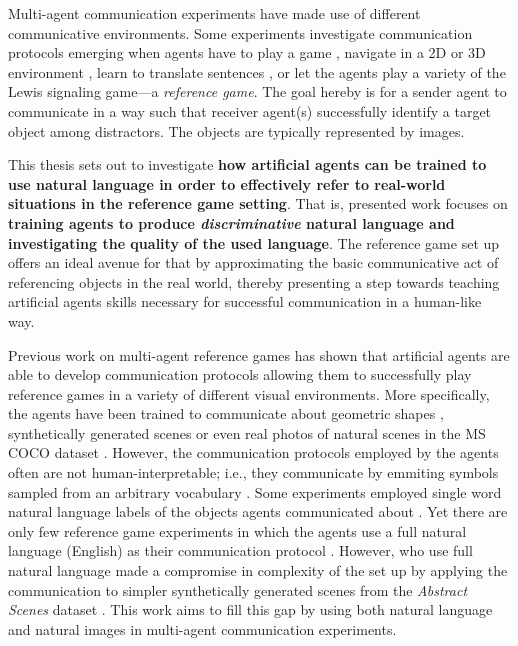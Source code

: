 Multi-agent communication experiments have made use of different communicative environments. Some experiments investigate communication protocols emerging when agents have to play a game \parencite{jacob2021multitasking}, navigate in a 2D or 3D environment \parencite{das2019tarmac, jaques2019social}, learn to translate sentences \parencite{lee2019countering}, or let the agents play a variety of the Lewis signaling game---a \textit{reference game}. The goal hereby is for a sender agent to communicate in a way such that receiver agent(s) successfully identify a target object among distractors. The objects are typically represented by images. 

This thesis sets out to investigate \textbf{how artificial agents can be trained to use natural language in order to effectively refer to real-world situations in the reference game setting}. That is, presented work focuses on \textbf{training agents to produce \textit{discriminative} natural language and investigating the quality of the used language}. The reference game set up offers an ideal avenue for that by approximating the basic communicative act of referencing objects in the real world, thereby presenting a step towards teaching artificial agents skills necessary for successful communication in a human-like way. 

Previous work on multi-agent reference games has shown that artificial agents are able to develop communication protocols allowing them to successfully play reference games in a variety of different visual environments. More specifically, the agents have been trained to communicate about geometric shapes \parencite{ohmer2021and}, synthetically generated scenes \parencite{lazaridou2020multi} or even real photos of natural scenes in the MS COCO dataset \parencite{lazaridou2016multi, lin2014microsoft, havrylov2017emergence}. However, the communication protocols employed by the agents often are not human-interpretable; i.e., they communicate by emmiting symbols sampled from an arbitrary vocabulary \parencite{foerster2016learning, lazaridou2016multi}. Some experiments employed single word natural language labels of the objects agents communicated about \parencite{lazaridou2016multi}. Yet there are only few reference game experiments in which the agents use a full natural language (English) as their communication protocol \parencite[e. g.,][]{lazaridou2020multi}. However, \cite{lazaridou2020multi} who use full natural language made a compromise in complexity of the set up by applying the communication to simpler synthetically generated scenes from the \textit{Abstract Scenes} dataset \parencite{zitnick2013bringing}. This work aims to fill this gap by using both natural language and natural images in multi-agent communication experiments. 

